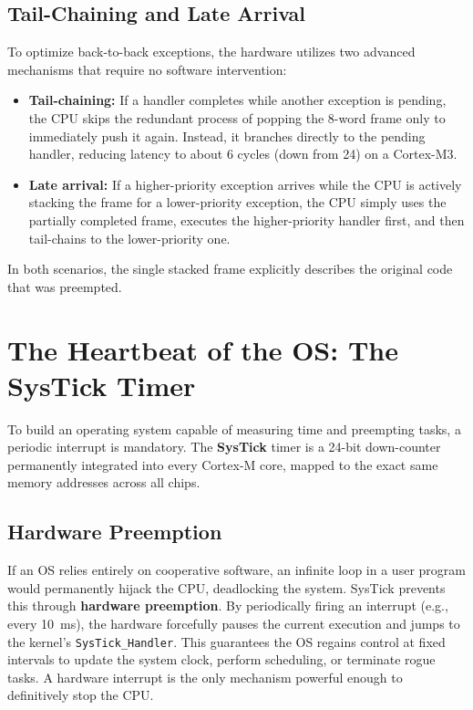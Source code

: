\subsection{Tail-Chaining and Late Arrival}
To optimize back-to-back exceptions, the hardware utilizes two advanced mechanisms that require no software intervention:
\begin{itemize}
    \item \textbf{Tail-chaining:} If a handler completes while another exception is pending, the CPU skips the redundant process of popping the 8-word frame only to immediately push it again. Instead, it branches directly to the pending handler, reducing latency to about 6 cycles (down from 24) on a Cortex-M3.
    \item \textbf{Late arrival:} If a higher-priority exception arrives while the CPU is actively stacking the frame for a lower-priority exception, the CPU simply uses the partially completed frame, executes the higher-priority handler first, and then tail-chains to the lower-priority one.
\end{itemize}
In both scenarios, the single stacked frame explicitly describes the original code that was preempted.

\section{The Heartbeat of the OS: The SysTick Timer}
To build an operating system capable of measuring time and preempting tasks, a periodic interrupt is mandatory. The \textbf{SysTick} timer is a 24-bit down-counter permanently integrated into every Cortex-M core, mapped to the exact same memory addresses across all chips.

\subsection{Hardware Preemption}
If an OS relies entirely on cooperative software, an infinite loop in a user program would permanently hijack the CPU, deadlocking the system. SysTick prevents this through \textbf{hardware preemption}. By periodically firing an interrupt (e.g., every 10~ms), the hardware forcefully pauses the current execution and jumps to the kernel's \texttt{SysTick\_Handler}. This guarantees the OS regains control at fixed intervals to update the system clock, perform scheduling, or terminate rogue tasks. A hardware interrupt is the only mechanism powerful enough to definitively stop the CPU.

